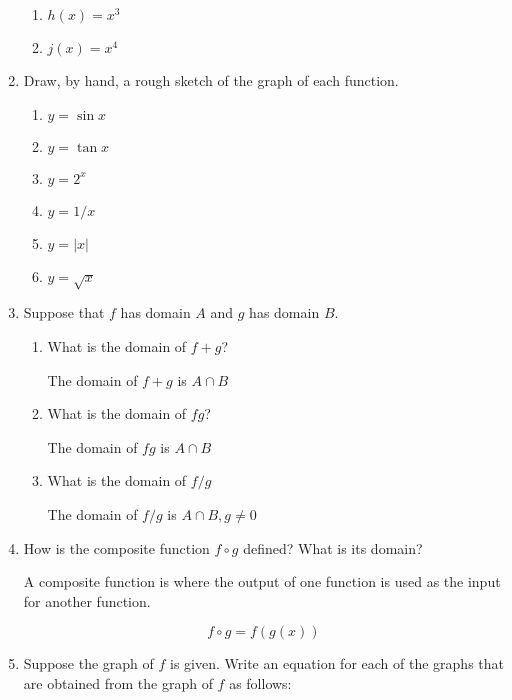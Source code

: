 \documentclass{article}
\begin{document}
\begin{enumerate}
\begin{enumerate}
			\item $h(x) = x^3$

			\item $j(x) = x^4$
		\end{enumerate}

		\item Draw, by hand, a rough sketch of the graph of each function.

		\begin{enumerate}
			\item $y = \sin x$

			\item $y = \tan x$

			\item $y = 2^x$

			\item $y = 1/x$

			\item $y = |x|$

			\item $y = \sqrt{x}$
		\end{enumerate}

		\item Suppose that $f$ has domain $A$ and $g$ has domain $B$.

		\begin{enumerate}
			\item What is the domain of $f + g$?

			The domain of $f + g$ is $A \cap B$


			\item What is the domain of $fg$?

			The domain of $fg$ is $A \cap B$

			\item What is the domain of $f/g$

			The domain of $f/g$ is $A \cap B, g \ne 0$ 
			
		\end{enumerate}

		\item How is the composite function $f \circ g$ defined? What is
			its domain?

		A composite function is where the output of one function is used as
		the input for another function.

		$$f \circ g = f(g(x))$$

		\item Suppose the graph of $f$ is given. Write an equation for each
		of the graphs that are obtained from the graph of $f$ as follows:


\end{enumerate}
\end{document}
